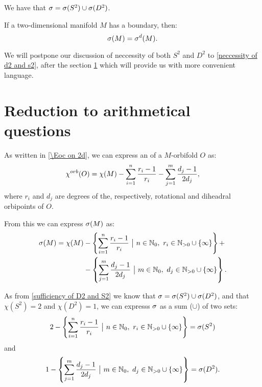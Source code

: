 \begin{corollary}
We have that ${\sigma} = {{\sigma}(S^2)} \cup {{\sigma}(D^2)}$.
\end{corollary}

\begin{observation}\label{only dihedral} 
If a two-dimensional manifold $M$ has a boundary, then:
\begin{equation}
{{\sigma}(M)} = {\sigma}^{d}(M).
\end{equation}
\end{observation}

We will postpone our discussion of neccessity of both $S^2$ and $D^2$ to 
\ref{neccessity of d2 and s2}, after 
the 
section \ref{Reduction to arithmetical questions section} which will provide us 
with more convenient language. 

\section{Reduction to arithmetical questions}\label{Reduction to arithmetical questions section}
As written in \ref{\Eoc on 2d}, we can express an \Eoc of a $M$-orbifold $O$ as:
\begin{equation}
{\chi^{orb}(O)} = \chi (M) - \sum_{i=1}^n \frac{r_i-1}{r_i} - \sum_{j=1}^m \frac{d_j-1}{2d_j},
\end{equation}
where $r_i$ and $d_j$ are degrees of the, respectively, rotational and diheadral orbipoints 
of $O$.

From this we can express ${{\sigma}(M)}$ as:
\begin{align}
\spe(M) = \chi (M) &-\left\{\sum\limits_{i=1}^n \frac{r_i-1}{r_i}\ \big|\ n\in\mathbb{N}_0,\ 
r_i\in\mathbb{N}_{>0}\cup \{\infty\}\right\}+ \\
&- \left\{\sum\limits_{j=1}^m\frac{d_j-1}{2d_j}\ 
\big|\ m\in\mathbb{N}_0,\ d_j\in\mathbb{N}_{>0}\cup \{\infty\}\right\} .
\end{align}

As from \ref{sufficiency of D2 and S2} we know that ${\sigma} = {{\sigma}(S^2)} \cup {{\sigma}(D^2)}$, and that 
$\chi (S^2) = 2$ and $\chi (D^2) = 1$, we can expresss ${\sigma}$ as a sum ($\cup$) of two sets:
\begin{equation}
2 -\left\{\sum\limits_{i=1}^n \frac{r_i-1}{r_i}\ \big|\ n\in\mathbb{N}_0,\ 
r_i\in\mathbb{N}_{>0}\cup \{\infty\}\right\} = \spe(S^2)
\end{equation}
and
\begin{equation}
1 - \left\{\sum\limits_{j=1}^m\frac{d_j-1}{2d_j}\ 
\big|\ m\in\mathbb{N}_0,\ d_j\in\mathbb{N}_{>0}\cup \{\infty\}\right\} = \spe(D^2) .
\end{equation}


